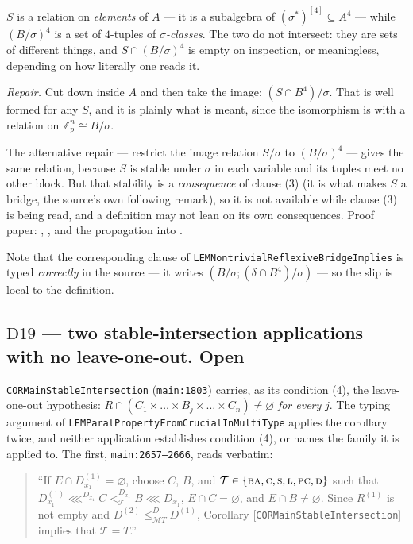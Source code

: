 $S$ is a relation on \emph{elements} of $A$ --- it is a subalgebra of
$(\sigma^{*})^{[4]}\subseteq A^{4}$ --- while $(B/\sigma)^{4}$ is a set of
$4$-tuples of \emph{$\sigma$-classes}. The two do not intersect: they are sets
of different things, and $S\cap(B/\sigma)^{4}$ is empty on inspection, or
meaningless, depending on how literally one reads it.

\emph{Repair.} Cut down inside $A$ and then take the image:
$(S\cap B^{4})/\sigma$. That is well formed for any $S$, and it is plainly what
is meant, since the isomorphism is with a relation on $\mathbb Z_{p}^{n}\cong
B/\sigma$.

The alternative repair --- restrict the image relation $S/\sigma$ to
$(B/\sigma)^{4}$ --- gives the same relation, because $S$ is stable under
$\sigma$ in each variable and its tuples meet no other block. But that
stability is a \emph{consequence} of clause (3) (it is what makes $S$ a bridge,
the source's own following remark), so it is not available while clause (3) is
being read, and a definition may not lean on its own consequences. Proof paper:
, , and the propagation
into .

Note that the corresponding clause of \texttt{LEMNontrivialReflexiveBridgeImplies}
is typed \emph{correctly} in the source --- it writes
$(B/\sigma;(\delta\cap B^{4})/\sigma)$ --- so the slip is local to the
definition.

\subsection{$\mathrm D{19}$ --- two stable-intersection applications with no
  leave-one-out. \textbf{Open}}\label{sec:D19}

\texttt{CORMainStableIntersection} (\texttt{main:1803}) carries, as its
condition (4), the leave-one-out hypothesis: $R\cap(C_{1}\times\dots\times
B_{j}\times\dots\times C_{n})\neq\varnothing$ \emph{for every} $j$. The
typing argument of \texttt{LEMParalPropertyFromCrucialInMultiType} applies
the corollary twice, and neither application establishes condition (4), or
names the family it is applied to. The first, \texttt{main:2657--2666},
reads verbatim:

\begin{quote}\small
``If $E\cap D_{x_1}^{(1)}=\varnothing$, choose $C$, $B$, and $\mathcal
T\in\{\textup{\textsc{ba}},\textup{\textsc{c}},\textup{\textsc{s}},\textup{\textsc{l}},\textup{\textsc{pc}},\textup{\textsc{d}}\}$ such that $D_{x_1}^{(1)}\lll^{D_{x_1}}
C<_{\mathcal T}^{D_{x_1}}B \lll D_{x_{1}}$, $E\cap C=\varnothing$, and
$E\cap B\neq \varnothing$. Since $R^{(1)}$ is not empty and $D^{(2)}\le_{
\mathcal M T}^{D}D^{(1)}$, Corollary [\texttt{CORMainStableIntersection}]
implies that $\mathcal T = T$.''
\end{quote}

